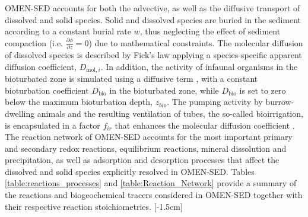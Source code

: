 \documentclass[gmd, manuscript]{copernicus}
\begin{document}
OMEN-SED accounts for both the advective, as well as the diffusive transport of dissolved and solid species. Solid and dissolved species are buried in the sediment according to a constant burial rate $w$, thus 
neglecting the effect of sediment compaction (i.e. $\frac{\partial \phi}{\partial z}=0$) due to mathematical constraints. 
The molecular diffusion of dissolved species is described by Fick's law applying a species-specific apparent diffusion coefficient, $D_{\mathrm{mol},i}$.  In addition, the activity of infaunal organisms in the bioturbated zone 
is simulated using a diffusive term \citep[e.g.][]{boudreau_mathematics_1986}, with a constant bioturbation coefficient $D_{\mathrm{bio}}$ in the bioturbated zone, 
while $D_{\mathrm{bio}}$ is set to zero below the maximum bioturbation depth, $z_{bio}$. 
The pumping activity by burrow-dwelling animals and the resulting ventilation of tubes, the so-called bioirrigation, is encapsulated in a factor $f_{ir}$ that enhances the molecular diffusion coefficient 
\citep[hence, $D_{i,0}=D_{\mathrm{mol},i}\cdot f_{ir}$,][]{soetaert_model_1996}. 
The reaction network of OMEN-SED accounts for the most important primary and secondary redox reactions, equilibrium reactions, mineral dissolution and precipitation, as well as adsorption and desorption processes that affect 
the dissolved and solid species explicitly resolved in OMEN-SED. Tables \ref{table:reactions_processes} and \ref{table:Reaction_Network} provide a summary of the reactions and biogeochemical tracers considered in OMEN-SED together 
with their respective reaction stoichiometries. %
[-1.5cm]%
\end{document}
